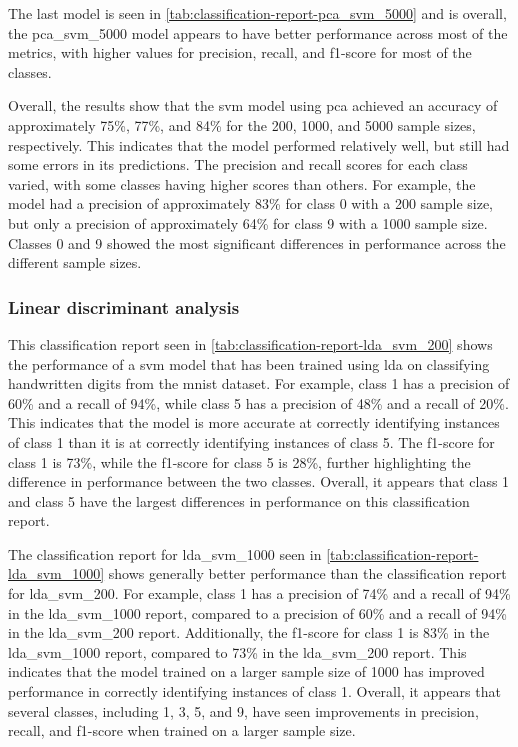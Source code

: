 The last model is seen in \autoref{tab:classification-report-pca_svm_5000} and is overall, the pca\_svm\_5000 model appears to have better performance across most of the metrics, with higher values for precision, recall, and f1-score for most of the classes.




Overall, the results show that the \gls{svm} model using \gls{pca} achieved an accuracy of approximately 75\%, 77\%, and 84\% for the 200, 1000, and 5000 sample sizes, respectively. This indicates that the model performed relatively well, but still had some errors in its predictions. The precision and recall scores for each class varied, with some classes having higher scores than others. For example, the model had a precision of approximately 83\% for class 0 with a 200 sample size, but only a precision of approximately 64\% for class 9 with a 1000 sample size. Classes 0 and 9 showed the most significant differences in performance across the different sample sizes.

\subsubsection{Linear discriminant analysis}\label{subsubsec:experiment_4_lda}




This classification report seen in \autoref{tab:classification-report-lda_svm_200} shows the performance of a \gls{svm} model that has been trained using \gls{lda} on classifying handwritten digits from the \gls{mnist} dataset. For example, class 1 has a precision of 60\% and a recall of 94\%, while class 5 has a precision of 48\% and a recall of 20\%. This indicates that the model is more accurate at correctly identifying instances of class 1 than it is at correctly identifying instances of class 5. The f1-score for class 1 is 73\%, while the f1-score for class 5 is 28\%, further highlighting the difference in performance between the two classes. Overall, it appears that class 1 and class 5 have the largest differences in performance on this classification report.



The classification report for lda\_svm\_1000 seen in \autoref{tab:classification-report-lda_svm_1000} shows generally better performance than the classification report for lda\_svm\_200. For example, class 1 has a precision of 74\% and a recall of 94\% in the lda\_svm\_1000 report, compared to a precision of 60\% and a recall of 94\% in the lda\_svm\_200 report. Additionally, the f1-score for class 1 is 83\% in the lda\_svm\_1000 report, compared to 73\% in the lda\_svm\_200 report. This indicates that the model trained on a larger sample size of 1000 has improved performance in correctly identifying instances of class 1. Overall, it appears that several classes, including 1, 3, 5, and 9, have seen improvements in precision, recall, and f1-score when trained on a larger sample size.


